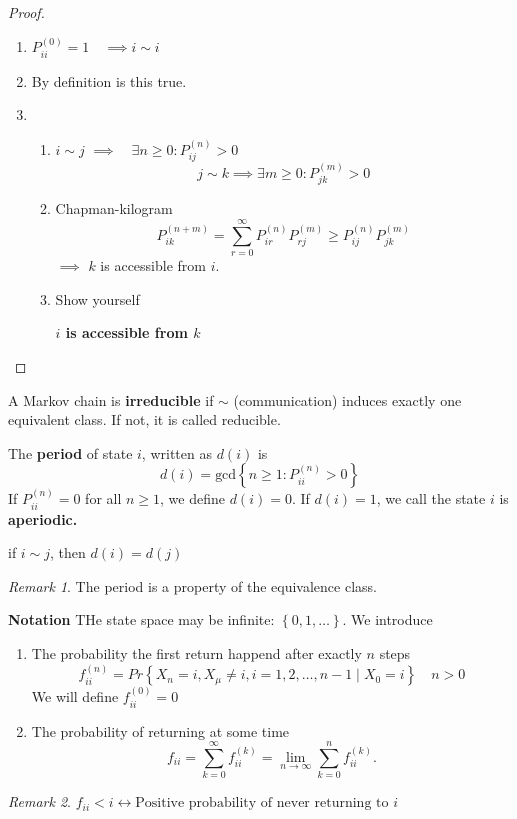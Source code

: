 \documentclass{article}
\theoremstyle{remark}
\newtheorem*{remark}{Remark}
\newcommand{\newpara}
  {
  \vskip 0.4cm
  }
\begin{document}
\begin{proof}
  \begin{enumerate}[label=(\roman*)]
    \item $P ^{\left( 0 \right)} _{ii} = 1 \quad  \implies  i \sim i   $ 
    \item By definition is this true.
    \item 
      \begin{enumerate}[label=(\alph*)]
        \item $ i \sim j$ $\implies  \quad  \exists n\ge 0: P ^{(n)} _{ij} > 0 $ \[
        j \sim  k \implies  \exists m\ge 0 : P^{(m)} _{jk} > 0
        \] 
      \item Chapman-kilogram \[
      P^{(n+m)} _{ik} = \sum_{r=0}^{\infty} P^{(n)}_{ir} P^{(m)}_{rj} \ge P^{(n)}_{ij} P^{(m)}_{jk}
      \] 
      $\implies $ $k$ is accessible from $i$.
    \item Show yourself 
      
      \newpara
      \textbf{$i$ is accessible from $k$} 

      \end{enumerate}
  \end{enumerate}
\end{proof}

\begin{definition}
  A Markov chain is \textbf{irreducible}  if $ \sim $ (communication) induces exactly one equivalent class.  If not, it is called reducible. 
\end{definition}
\begin{definition}
  The \textbf{period}  of state $i$, written as $d\left( i \right)$ is \[
  d\left( i \right) = \text{gcd}\left\{ n \ge 1: P ^{(n)} _{ii} > 0 \right\}
  \] 
  If $P^{(n)} _{ii} = 0$ for all $n\ge 1$, we define $d\left( i \right) = 0$. If $d\left( i \right) = 1$, we call the state $i$ is \textbf{aperiodic.} 
\end{definition}
\begin{theorem}
  if $i \sim j$, then $d\left( i \right) = d\left( j \right)$
\end{theorem}
\begin{remark}
   The period is a property of the equivalence class.
\end{remark}

\textbf{Notation} THe state space may be infinite: $\left\{ 0,1, \ldots \right\}$. We introduce  
\begin{enumerate}[label=(\roman*)]
  \item The probability the first return happend after exactly $n$ steps \[
  f_{ii}^{(n)} = Pr \left \{ X_{n} = i, X_{\mu }\neq i, i  = 1,2, \ldots, n-1  \mid X_{0} = i  \right \}  \quad  n> 0 
  \] 
  We will define $f_{ii}^{(0)} = 0$
\item The probability of returning at some time \[
f_{ii} = \sum_{k= 0}^{\infty}  f_{ii}^{(k)} = \lim_{n \to  \infty}  \sum_{k= 0}^{n} f^{(k)} _{ii} .
\] 
\end{enumerate}
 \begin{remark}
   $f_{ii} < i \leftrightarrow  \text{Positive probability of never returning to $i$}$
 \end{remark}
\end{document}
